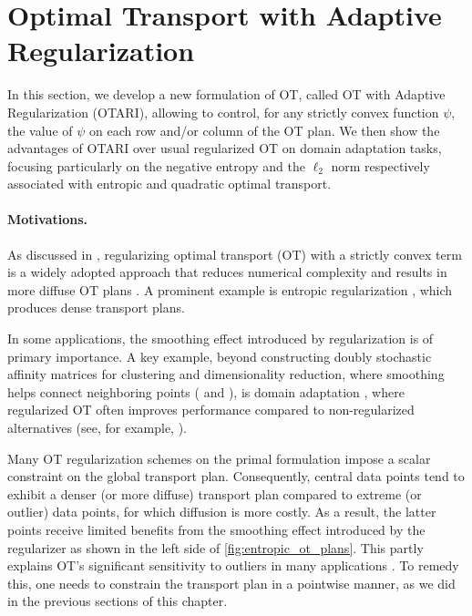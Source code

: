 
\section{Optimal Transport with Adaptive Regularization}\label{sec:OTARI}

In this section, we develop a new formulation of OT, called OT with Adaptive Regularization (OTARI), allowing to control, for any strictly convex function $\psi$, the value of $\psi$ on each row and/or column of the OT plan. 
We then show the advantages of OTARI over usual regularized OT on domain adaptation tasks, focusing particularly on the negative entropy and the $\ell_2$ norm respectively associated with entropic \citep{cuturi2013sinkhorn} and quadratic \citep{blondel2018smooth} optimal transport.

\paragraph{Motivations.}
As discussed in , regularizing optimal transport (OT) with a strictly convex term is a widely adopted approach that reduces numerical complexity and results in more diffuse OT plans \citep{peyre2019computational}. A prominent example is entropic regularization \citep{cuturi2013sinkhorn}, which produces dense transport plans.

In some applications, the smoothing effect introduced by regularization is of primary importance. A key example, beyond constructing doubly stochastic affinity matrices for clustering and dimensionality reduction, where smoothing helps connect neighboring points ( and ), is domain adaptation \citep{courty2017joint}, where regularized OT often improves performance compared to non-regularized alternatives (see, for example, ).

Many OT regularization schemes on the primal formulation impose a scalar constraint on the global transport plan.
Consequently, central data points tend to exhibit a denser (or more diffuse) transport plan compared to extreme (or outlier) data points, for which diffusion is more costly. As a result, the latter points receive limited benefits from the smoothing effect introduced by the regularizer as shown in the left side of \cref{fig:entropic_ot_plans}. This partly explains OT's significant sensitivity to outliers in many applications \citep{mukherjee2021outlier, pmlr-v202-chuang23a}.
To remedy this, one needs to constrain the transport plan in a pointwise manner, as we did in the previous sections of this chapter.



